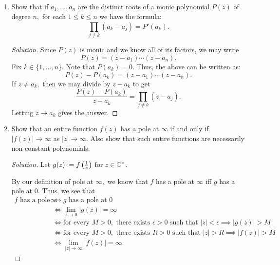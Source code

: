 \documentclass[12pt]{article}
\theoremstyle{definition}
\newenvironment{soln}{\begin{proof}[Solution]}{\end{proof}}
\begin{document}
\begin{enumerate}[leftmargin=*]
\begin{soln}
    \end{soln}
    \item Show that if $a_1, \ldots, a_n$ are the distinct roots of a monic polynomial $P(z)$ of degree $n,$ for each $1 \le k \le n$  we have the formula:
    \begin{equation*} 
    	\prod_{j \neq k}^{}(a_k - a_j) = P'(a_k).
    \end{equation*}
    \begin{soln}
    	Since $P(z)$ is monic and we know all of its factors, we may write
    	\begin{equation*} 
    		P(z) = (z - a_1)\cdots(z - a_n).
    	\end{equation*}
    	Fix $k \in \{1, \ldots, n\}.$ Note that $P(a_k) = 0.$ Thus, the above can be written as:
    	\begin{equation*} 
    		P(z) - P(a_k) = (z - a_1)\cdots(z - a_n).
    	\end{equation*}
    	If $z \neq a_k,$ then we may divide by $z - a_k$ to get
    	\begin{equation*} 
    		\dfrac{P(z) - P(a_k)}{z - a_k} = \prod_{j \neq k}^{}(z - a_j).
    	\end{equation*}
    	Letting $z \to a_k$ gives the answer.
    \end{soln}
    \item Show that an entire function $f(z)$ has a pole at $\infty$ if and only if $|f(z)| \to \infty$ as $|z| \to \infty.$ Also show that such entire functions are necessarily non-constant polynomials.
    \begin{soln}
    	Let $g(z) \vcentcolon= f\left(\frac{1}{z}\right)$ for $z \in \mathbb{C}^\times.$

    	By our definition of pole at $\infty,$ we know that $f$ has a pole at $\infty$ iff $g$ has a pole at $0.$ Thus, we see that
    	\begin{align*} 
    		f \text{ has a pole at }\infty &\iff g \text{ has a pole at }0\\
    		&\iff \lim_{z\to 0}\left|g(z)\right| = \infty\\
    		&\iff \text{for every } M > 0, \text{ there exists } \epsilon > 0 \text{ such that } |z| < \epsilon \implies |g(z)| > M\\
    		& \iff \text{for every } M > 0, \text{ there exists } R > 0 \text{ such that } |z| > R \implies |f(z)| > M\\
    		& \iff \lim_{|z|\to \infty}|f(z)| = \infty
    	\end{align*}


\end{soln}
\end{enumerate}
\end{document}
